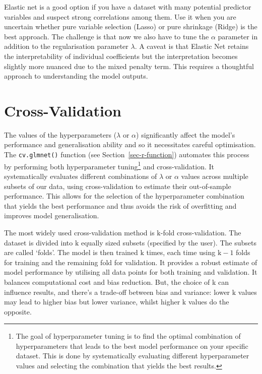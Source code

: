 \documentclass[
  letterpaper,
]{book}
\begin{document}
Elastic net is a good option if you have a dataset with many potential
predictor variables and suspect strong correlations among them. Use it
when you are uncertain whether pure variable selection (Lasso) or pure
shrinkage (Ridge) is the best approach. The challenge is that now we
also have to tune the \(\alpha\) parameter in addition to the
regularisation parameter \(\lambda\). A caveat is that Elastic Net
retains the interpretability of individual coefficients but the
interpretation becomes slightly more nuanced due to the mixed penalty
term. This requires a thoughtful approach to understanding the model
outputs.

\section{Cross-Validation}\label{sec-cross-validation}

The values of the hyperparameters (\(\lambda\) or \(\alpha\))
significantly affect the model's performance and generalisation ability
and so it necessitates careful optimisation. The \texttt{cv.glmnet()}
function (see Section~\ref{sec-r-function}) automates this process by
performing both hyperparameter tuning\footnote{The goal of
  hyperparameter tuning is to find the optimal combination of
  hyperparameters that leads to the best model performance on your
  specific dataset. This is done by systematically evaluating different
  hyperparameter values and selecting the combination that yields the
  best results.} and cross-validation. It systematically evaluates
different combinations of \(\lambda\) or \(\alpha\) values across
multiple subsets of our data, using cross-validation to estimate their
out-of-sample performance. This allows for the selection of the
hyperparameter combination that yields the best performance and thus
avoids the risk of overfitting and improves model generalisation.

The most widely used cross-validation method is \(\text{k}\)-fold
cross-validation. The dataset is divided into \(\text{k}\) equally sized
subsets (specified by the user). The subsets are called `folds'. The
model is then trained \(\text{k}\) times, each time using \(\text{k}-1\)
folds for training and the remaining fold for validation. It provides a
robust estimate of model performance by utilising all data points for
both training and validation. It balances computational cost and bias
reduction. But, the choice of k can influence results, and there's a
trade-off between bias and variance: lower \(\text{k}\) values may lead
to higher bias but lower variance, whilst higher \(\text{k}\) values do
the opposite.
\end{document}
